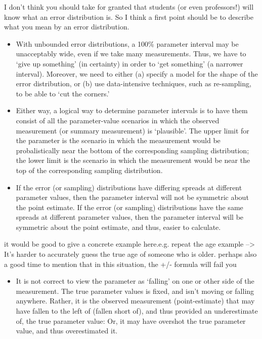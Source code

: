 \documentclass[]{book}
\providecommand{\tightlist}{%
  \setlength{\itemsep}{0pt}\setlength{\parskip}{0pt}}
\begin{document}
I don't think you should take for granted that students (or even professors!) will know what an error distribution is. So I think a first point should be to describe what you mean by an error distribution.

\begin{itemize}
\item
  With unbounded error distributions, a 100\% parameter interval may be unacceptably wide, even if we take many measurements. Thus, we have to `give up something' (in certainty) in order to `get something' (a narrower interval). Moreover, we need to either (a) specify a model for the shape of the error distribution, or (b) use data-intensive techniques, such as re-sampling, to be able to `cut the corners.'
\item
  Either way, a logical way to determine parameter intervals is to have them consist of all the parameter-value scenarios in which the observed measurement (or summary measurement) is `plausible'. The upper limit for the parameter is the scenario in which the measurement would be probalistically near the bottom of the corresponding sampling distribution; the lower limit is the scenario in which the measurement would be near the top of the corresponding sampling distribution.
\item
  If the error (or sampling) distributions have differing spreads at different parameter values, then the parameter interval will not be symmetric about the point estimate. If the error (or sampling) distributions have the same spreads at different parameter values, then the parameter interval will be symmetric about the point estimate, and thus, easier to calculate.
\end{itemize}

it would be good to give a concrete example here.e.g. repeat the age example --\textgreater{} It's harder to accurately guess the true age of someone who is older.
perhaps also a good time to mention that in this situation, the +/- formula will fail you

\begin{itemize}
\tightlist
\item
  It is not correct to view the parameter as `falling' on one or other side of the measurement. The true parameter values is fixed, and isn't moving or falling anywhere. Rather, it is the observed measurement (point-estimate) that may have fallen to the left of (fallen short of), and thus provided an underestimate of, the true parameter value: Or, it may have overshot the true parameter value, and thus overestimated it.
\end{itemize}
\end{document}
